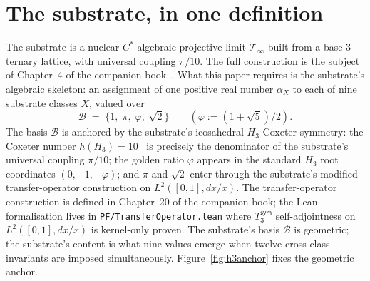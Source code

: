\documentclass[11pt,a4paper]{amsart}
\theoremstyle{plain}
\theoremstyle{definition}
\begin{document}
\section{The substrate, in one definition}\label{sec:substrate}

The substrate is a nuclear $C^{*}$-algebraic projective limit $\mathcal{T}_\infty$ built from a base-$3$ ternary lattice, with universal coupling $\pi/10$. The full construction is the subject of Chapter~4 of the companion book~\cite{cohen2026book}. What this paper requires is the substrate's algebraic skeleton: an assignment of one positive real number $\alpha_X$ to each of nine substrate classes $X$, valued over
\[
\mathcal{B} \;=\; \{1,\;\pi,\;\varphi,\;\sqrt{2}\} \qquad (\varphi := (1+\sqrt{5})/2).
\]
The basis $\mathcal{B}$ is anchored by the substrate's icosahedral $H_3$-Coxeter symmetry: the Coxeter number $h(H_3) = 10$~\cite{bourbaki1968} is precisely the denominator of the substrate's universal coupling $\pi/10$; the golden ratio $\varphi$ appears in the standard $H_3$ root coordinates $(0, \pm 1, \pm \varphi)$; and $\pi$ and $\sqrt{2}$ enter through the substrate's modified-transfer-operator construction on $L^2([0,1], dx/x)$. The transfer-operator construction is defined in Chapter~20 of the companion book; the Lean formalisation lives in \texttt{PF/TransferOperator.lean} where $T_3^{\textsf{sym}}$ self-adjointness on $L^2([0,1], dx/x)$ is kernel-only proven. The substrate's basis $\mathcal{B}$ is geometric; the substrate's content is what nine values emerge when twelve cross-class invariants are imposed simultaneously. Figure~\ref{fig:h3anchor} fixes the geometric anchor.
\end{document}
